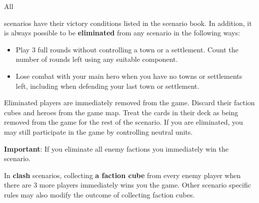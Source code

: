 \hypertarget{End}{All} scenarios have their victory conditions listed in the scenario book.
In addition, it is always possible to be \textbf{eliminated} from any scenario in the following ways:
\begin{itemize}
  \item Play 3 full rounds without controlling a town or a settlement.
Count the number of rounds left using any suitable component.
  \item Lose combat with your main hero when you have no towns or settlements left, including when defending your last town or settlement.
\end{itemize}
Eliminated players are immediately removed from the game.
Discard their faction cubes and heroes from the game map.
Treat the cards in their deck as being removed from the game for the rest of the scenario.
If you are eliminated, you may still participate in the game by controlling neutral units.\par
\textbf{Important}: If you eliminate all enemy factions you immediately win the scenario.\par
In \textbf{clash} scenarios, collecting \textbf{a faction cube} from every enemy player when there are 3 more players immediately wins you the game.
Other scenario specific rules may also modify the outcome of collecting faction cubes.
